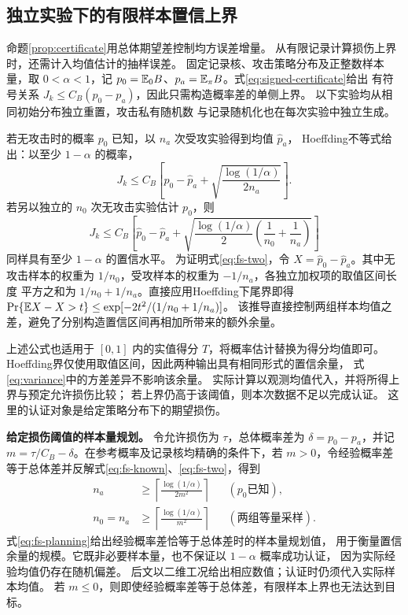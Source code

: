 \subsection{独立实验下的有限样本置信上界}
\label{sec:finite-sample}

命题\ref{prop:certificate}用总体期望差控制均方误差增量。
从有限记录计算损伤上界时，还需计入均值估计的抽样误差。
固定记录核、攻击策略分布及正整数样本量，取 $0<\alpha<1$，记
$p_0=\mathbb E_0B$、$p_a=\mathbb E_\pi B$。式\eqref{eq:signed-certificate}给出
有符号关系 $J_k\le C_B(p_0-p_a)$，因此只需构造概率差的单侧上界。
以下实验均从相同初始分布独立重置，攻击私有随机数
与记录随机化也在每次实验中独立生成。

若无攻击时的概率 $p_0$ 已知，以 $n_a$ 次受攻实验得到均值 $\hat p_a$，
Hoeffding不等式\cite{hoeffding1963}给出：以至少 $1-\alpha$ 的概率，
\begin{equation}
 J_k\le C_B\left[p_0-\hat p_a+
 \sqrt{\frac{\log(1/\alpha)}{2n_a}}\right].
 \label{eq:fs-known}
\end{equation}
若另以独立的 $n_0$ 次无攻击实验估计 $p_0$，则
\begin{equation}
 J_k\le C_B\left[\hat p_0-\hat p_a+
 \sqrt{\frac{\log(1/\alpha)}{2}
 \left(\frac1{n_0}+\frac1{n_a}\right)}\right]
 \label{eq:fs-two}
\end{equation}
同样具有至少 $1-\alpha$ 的置信水平。
为证明式\eqref{eq:fs-two}，令 $X=\hat p_0-\hat p_a$。其中无攻击样本的权重为
$1/n_0$，受攻样本的权重为 $-1/n_a$，各独立加权项的取值区间长度
平方之和为 $1/n_0+1/n_a$。直接应用Hoeffding下尾界即得
$\Pr\{\mathbb E X-X>t\}\le\exp[-2t^2/(1/n_0+1/n_a)]$。
该推导直接控制两组样本均值之差，避免了分别构造置信区间再相加所带来的额外余量。

上述公式也适用于 $[0,1]$ 内的实值得分 $T$，将概率估计替换为得分均值即可。
Hoeffding界仅使用取值区间，因此两种输出具有相同形式的置信余量，
式\eqref{eq:variance}中的方差差异不影响该余量。
实际计算以观测均值代入，并将所得上界与预定允许损伤比较；
若上界仍高于该阈值，则本次数据不足以完成认证。
这里的认证对象是给定策略分布下的期望损伤。

\textbf{给定损伤阈值的样本量规划。}
令允许损伤为 $\tau$，总体概率差为 $\delta=p_0-p_a$，并记
$m=\tau/C_B-\delta$。在参考概率及记录核均精确的条件下，若 $m>0$，令经验概率差
等于总体差并反解式\eqref{eq:fs-known}、\eqref{eq:fs-two}，得到
\begin{equation}
 \begin{aligned}
 n_a&\ge\left\lceil\frac{\log(1/\alpha)}{2m^2}\right\rceil
 &&(p_0\text{已知}),\\
 n_0=n_a&\ge\left\lceil\frac{\log(1/\alpha)}{m^2}\right\rceil
 &&(\text{两组等量采样}).
 \end{aligned}
 \label{eq:fs-planning}
\end{equation}
式\eqref{eq:fs-planning}给出经验概率差恰等于总体差时的样本量规划值，
用于衡量置信余量的规模。它既非必要样本量，也不保证以 $1-\alpha$ 概率成功认证，
因为实际经验均值仍存在随机偏差。
后文以二维工况给出相应数值；认证时仍须代入实际样本均值。
若 $m\le0$，则即使经验概率差等于总体差，有限样本上界也无法达到目标。


